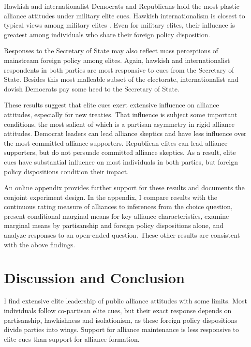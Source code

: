 \documentclass[12pt]{article}
\begin{document}
 
Hawkish and internationalist Democrats and Republicans hold the most plastic alliance attitudes under military elite cues.
Hawkish internationalism is closest to typical views among military elites \citep{ZwaldBerejikian2021}. 
Even for military elites, their influence is greatest among individuals who share their foreign policy disposition. 


Responses to the Secretary of State may also reflect mass perceptions of mainstream foreign policy among elites.
Again, hawkish and internationalist respondents in both parties are most responsive to cues from the Secretary of State.
Besides this most malleable subset of the electorate, internationalist and dovish Democrats pay some heed to the Secretary of State.  


These results suggest that elite cues exert extensive influence on alliance attitudes, especially for new treaties.
That influence is subject some important conditions, the most salient of which is a partisan asymmetry in rigid alliance attitudes. 
Democrat leaders can lead alliance skeptics and have less influence over the most committed alliance supporters. 
Republican elites can lead alliance supporters, but do not persuade committed alliance skeptics. 
As a result, elite cues have substantial influence on most individuals in both parties, but foreign policy dispositions condition their impact. 


An online appendix provides further support for these results and documents the conjoint experiment design. 
In the appendix, I compare results with the continuous rating measure of alliances to inferences from the choice question, present conditional marginal means for key alliance characteristics, examine marginal means by partisanship and foreign policy dispositions alone, and analyze responses to an open-ended question. 
These other results are consistent with the above findings. 


\section{Discussion and Conclusion} 


I find extensive elite leadership of public alliance attitudes with some limits.  
Most individuals follow co-partisan elite cues, but their exact response depends on partisanship, hawkishness and isolationism, as these foreign policy dispositions divide parties into wings.
Support for alliance maintenance is less responsive to elite cues than support for alliance formation. 
\end{document}
